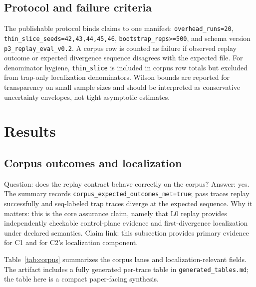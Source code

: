 \documentclass[11pt]{article}
\newcommand{\field}[1]{\texttt{#1}}
\newcommand{\code}[1]{\texttt{#1}}
\newcommand{\Lzero}{\ensuremath{\mathrm{L0}}}
\begin{document}
\subsection{Protocol and failure criteria}
The publishable protocol binds claims to one manifest: \field{overhead\_runs=20}, \field{thin\_slice\_seeds=42,43,44,45,46}, \field{bootstrap\_reps>=500}, and schema version \field{p3\_replay\_eval\_v0.2}. A corpus row is counted as failure if observed replay outcome or expected divergence sequence disagrees with the expected file. For denominator hygiene, \code{thin\_slice} is included in corpus row totals but excluded from trap-only localization denominators. Wilson bounds are reported for transparency on small sample sizes and should be interpreted as conservative uncertainty envelopes, not tight asymptotic estimates.

\section{Results}

\subsection{Corpus outcomes and localization}

Question: does the replay contract behave correctly on the corpus?  
Answer: yes. The summary records \field{corpus\_expected\_outcomes\_met=true}; pass traces replay successfully and seq-labeled trap traces diverge at the expected sequence.  
Why it matters: this is the core assurance claim, namely that \Lzero{} replay provides independently checkable control-plane evidence and first-divergence localization under declared semantics.
Claim link: this subsection provides primary evidence for C1 and for C2's localization component.

Table~\ref{tab:corpus} summarizes the corpus lanes and localization-relevant fields. The artifact includes a fully generated per-trace table in \code{generated\_tables.md}; the table here is a compact paper-facing synthesis.
\end{document}
